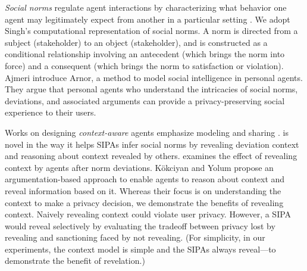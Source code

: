 \emph{Social norms} regulate agent interactions by characterizing
what behavior one agent may legitimately expect from another in a particular 
setting \citep{Kafali-IS16-Revani,Singh-2013-Norms}. 
%
We adopt Singh's  computational representation 
of social norms. A norm is directed from a subject (stakeholder) to an 
object (stakeholder), and is constructed
as a conditional relationship involving an antecedent (which brings the
norm into force) and a consequent (which brings the norm to satisfaction
or violation). 
Ajmeri {\etal}  
introduce Arnor, a method to model social intelligence in personal agents. 
They argue that personal agents who understand 
the intricacies of social norms, deviations, and associated arguments can 
provide a privacy-preserving social experience to their users. 

Works on designing \emph{context-aware} agents emphasize modeling \citep{Murukannaiah-AAMAS14-Xipho} and sharing \citep{Ajmeri-AAMAS17-Arnor}. 
\frameworkB is novel in the way it helps SIPAs infer social norms by 
revealing deviation context and reasoning about context revealed by others. \frameworkB
examines the effect of revealing context by agents after norm
deviations. K{\"o}kciyan and Yolum  
propose an argumentation-based approach to enable agents to reason about context and reveal information based on it. Whereas their focus is on understanding the context to make a privacy decision, we demonstrate the benefits of revealing context. 
%
Naively revealing context could violate user privacy. However, a SIPA 
would reveal selectively by evaluating the tradeoff between privacy lost by revealing and sanctioning faced by not revealing. (For simplicity, in our experiments, the context model is simple and the SIPAs always reveal---to demonstrate the benefit of revelation.)


